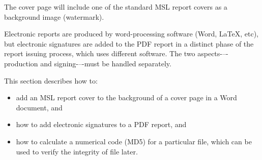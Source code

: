 The cover page will include one of the standard MSL report covers as a background image (watermark).

Electronic reports are produced by word-processing software (Word, LaTeX, etc), but electronic signatures are added to the PDF report in a distinct phase of the report issuing process, which uses different software. The two aspects-–-production and signing-–-must be handled separately. 
 
This section describes how to: 
\begin{itemize}
\item	add an MSL report cover to the background of a cover page in a Word document, and
\item	how to add electronic signatures to a PDF report, and 
\item	how to calculate a numerical code (MD5) for a particular file, which can be used to verify the integrity of file later.
\end{itemize}

